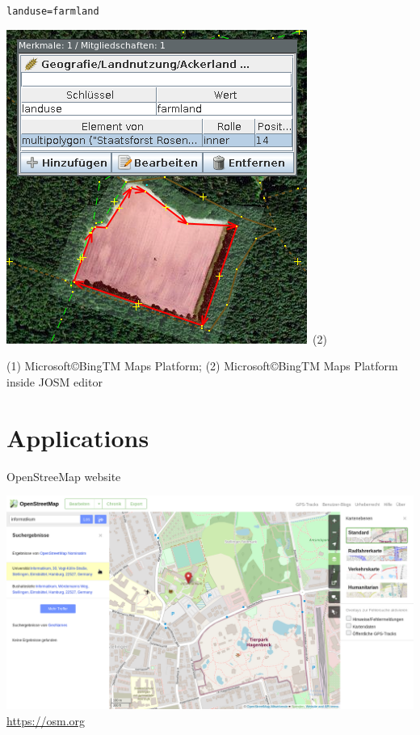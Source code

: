 \documentclass{beamer}
\begin{document}
\begin{frame}
\begin{center}
			\begin{minipage}[b][0.6\textheight][c]{0.3\linewidth}
				\texttt{landuse=farmland}
				\begin{center}
					\includegraphics[width=\linewidth,height=\textheight,keepaspectratio]{images/multipolygon_josm.png}~\tiny{(2)}
				\end{center}
			\end{minipage}
		\end{center}
		{\tiny (1) Microsoft\copyright BingTM Maps Platform; (2) Microsoft\copyright BingTM Maps Platform inside JOSM editor}
	\end{frame}

	\section{Applications}
	
	\begin{frame}{OpenStreeMap website}
		\begin{center}
			\includegraphics[height=0.7\textheight]{images/osm-website}\\
			\url{https://osm.org}
		\end{center}
	\end{frame}
\end{document}
